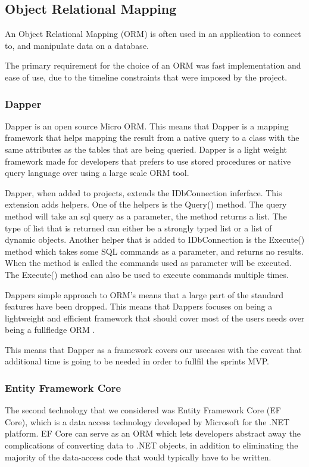 \subsection{Object Relational Mapping}
An Object Relational Mapping (ORM) is often used in an application to connect to, and manipulate data on a database.

The primary requirement for the choice of an ORM was fast implementation and ease of use, due to the timeline constraints that were imposed by the \knox{} project. 

\subsubsection{Dapper}
Dapper is an open source Micro ORM. This means that Dapper is a mapping framework that helps mapping the result from a native query to a class with the same attributes as the tables that are being queried. Dapper is a light weight framework made for developers that prefers to use stored procedures or native query language over using a large scale ORM tool. 


Dapper, when added to projects, extends the IDbConnection inferface. This extension adds helpers. 
One of the helpers is the Query() method. The query method will take an sql query as a parameter, the method returns a list. The type of list that is returned can either be a strongly typed list or a list of dynamic objects.
Another helper that is added to IDbConnection is the Execute() method which takes some SQL commands as a parameter, and returns no results. When the method is called the commands used as parameter will be executed. The Execute() method can also be used to execute commands multiple times\cite{Dapper_Git}.

Dappers simple approach to ORM's means that a large part of the standard features have been dropped. This means that Dappers focuses on being a lightweight and efficient framework that should cover most of the users needs over being a fullfledge ORM \cite{Dapper_Git}.

This means that Dapper as a framework covers our usecases with the caveat that additional time is going to be needed in order to fullfil the sprints MVP. 

\subsubsection{Entity Framework Core}
The second technology that we considered was Entity Framework Core (EF Core), which is a data access technology developed by Microsoft for the .NET platform. EF Core can serve as an ORM \cite{Object_relational_mapping} which lets developers abstract away the complications of converting data to .NET objects, in addition to eliminating the majority of the data-access code that would typically have to be written.

